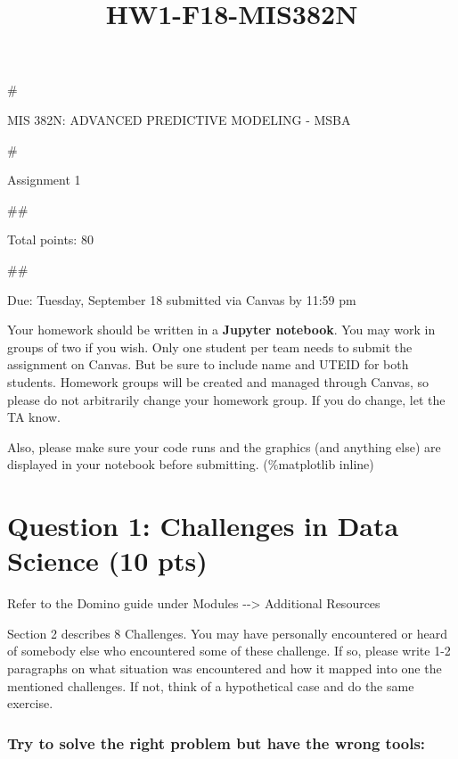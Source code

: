 \documentclass[11pt]{article}
\title{HW1-F18-MIS382N}
\begin{document}
    
    
    \maketitle
    
    

    
    \#

MIS 382N: ADVANCED PREDICTIVE MODELING - MSBA

\#

Assignment 1

\#\#

Total points: 80

\#\#

Due: Tuesday, September 18 submitted via Canvas by 11:59 pm

Your homework should be written in a \textbf{Jupyter notebook}. You may
work in groups of two if you wish. Only one student per team needs to
submit the assignment on Canvas. But be sure to include name and UTEID
for both students. Homework groups will be created and managed through
Canvas, so please do not arbitrarily change your homework group. If you
do change, let the TA know.

Also, please make sure your code runs and the graphics (and anything
else) are displayed in your notebook before submitting. (\%matplotlib
inline)

    \section{Question 1: Challenges in Data Science (10
pts)}\label{question-1-challenges-in-data-science-10-pts}

Refer to the Domino guide under Modules -\/-\textgreater{} Additional
Resources

Section 2 describes 8 Challenges. You may have personally encountered or
heard of somebody else who encountered some of these challenge. If so,
please write 1-2 paragraphs on what situation was encountered and how it
mapped into one the mentioned challenges. If not, think of a
hypothetical case and do the same exercise.

\subsubsection{Try to solve the right problem but have the wrong
tools:}\label{try-to-solve-the-right-problem-but-have-the-wrong-tools}
\end{document}
